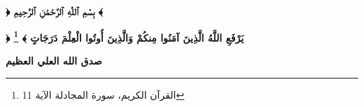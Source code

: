 \renewcommand{\thefootnote}{\fnsymbol{footnote}}

\chapter*{}
\vfill
\begin{center}
	\Large
	\amirifont \textbf{﴿ بِسْمِ ٱللّٰهِ ٱلرَّحْمَٰنِ ٱلرَّحِيمِ ﴾}
\end{center}
\thispagestyle{empty}
{\amirifont	\begin{center}\bfseries\Large
		﴿ يَرْفَعِ اللَّهُ الَّذِينَ آمَنُوا مِنكُمْ وَالَّذِينَ أُوتُوا الْعِلْمَ دَرَجَاتٍ ﴾
		\footnote{القرآن الكريم، سورة المجادلة الآية 11}
	\end{center}
	\hfill \textbf{صدق الله العلي العظيم}
}
\vfill